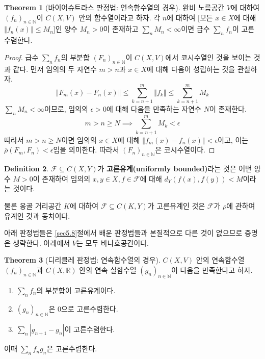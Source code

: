 \documentclass[11pt]{book}
\numberwithin{equation}{chapter}
\def\NN{\mathbb{N}}
\def\RR{\mathbb{R}}
\def\eps{\epsilon}
\def\calF{\mathcal{F}}
\newcommand{\abs}[1]{\left\vert#1\right\vert}
\newcommand{\norm}[1]{\left\Vert#1\right\Vert}
\theoremstyle{definition}
\newtheorem{thm}{Theorem}[section]
\newtheorem{defn}[thm]{Definition}
\newenvironment{enum}
	{\begin{enumerate}[label=(\alph*), leftmargin=2\parindent]}
	{\end{enumerate}}
\begin{document}
\begin{thm}[바이어슈트라스 판정법: 연속함수열의 경우]
    완비 노름공간 \(V\)에 대하여 \((f_n)_{n \in \NN}\)이 \(C(X, V)\) 안의 함수열이라고 하자. 각 \(n\)에 대하여 [모든 \(x \in X\)에 대해 \(\norm{f_n(x)} \le M_n\)]인 양수 \(M_n > 0\)이 존재하고 \(\sum_n M_n < \infty\)이면 급수 \(\sum_n f_n\)이 고른수렴한다.
\end{thm}
\begin{proof}
    급수 \(\sum_n f_n\)의 부분합 \((F_n)_{n \in \NN}\)이 \(C(X, V)\)에서 코시수열인 것을 보이는 것과 같다. 먼저 임의의 두 자연수 \(m > n\)과 \(x \in X\)에 대해 다음이 성립하는 것을 관찰하자.
    \[
    \norm{F_m(x) - F_n(x)} \le \sum_{k=n+1}^m \norm{f_k} \le \sum_{k=n+1}^m M_k  
    \]
    \(\sum_n M_n < \infty\)이므로, 임의의 \(\eps > 0\)에 대해 다음을 만족하는 자연수 \(N\)이 존재한다.
    \[
    m > n \ge N \implies \sum_{k=n+1}^m M_k < \eps    
    \]
    따라서 \(m > n \ge N\)이면 임의의 \(x \in X\)에 대해 \(\norm{f_m(x) - f_n(x)} < \eps\)이고, 이는 \(\overline{\rho}(F_m, F_n) < \eps\)임을 의미한다. 따라서 \((F_n)_{n \in \NN}\)은 코시수열이다.
\end{proof}

\begin{defn}
    \(\calF \subseteq C(X, Y)\)가 \textbf{고른유계(uniformly bounded)}라는 것은 어떤 양수 \(M > 0\)이 존재하여 임의의 \(x, y \in X, f \in \calF\)에 대해 \(d_Y(f(x), f(y)) < M\)이라는 것이다.
\end{defn}

물론 옹골 거리공간 \(K\)에 대하여 \(\calF \subseteq C(K, Y)\)가 고른유계인 것은 \(\calF\)가 \(\rho\)에 관하여 유계인 것과 동치이다.

아래 판정법들은 \ref{sec5.8}절에서 배운 판정법들과 본질적으로 다른 것이 없으므로 증명은 생략한다. 아래에서 \(V\)는 모두 바나흐공간이다. 

\begin{thm}[디리클레 판정법: 연속함수열의 경우]
    \(C(X, V)\) 안의 연속함수열 \((f_n)_{n \in \NN}\)과 \(C(X, \RR)\) 안의 연속 실함수열 \((g_n)_{n \in \NN}\)이 다음을 만족한다고 하자.
    \begin{enum}
        \item \(\sum_n f_n\)의 부분합이 고른유계이다.
        \item \((g_n)_{n \in \NN}\)은 0으로 고른수렴한다.
        \item \(\sum_n \abs{g_{n+1} - g_n}\)이 고른수렴한다.
    \end{enum}
    이때 \(\sum_n f_n g_n\)은 고른수렴한다.
\end{thm}
\end{document}
